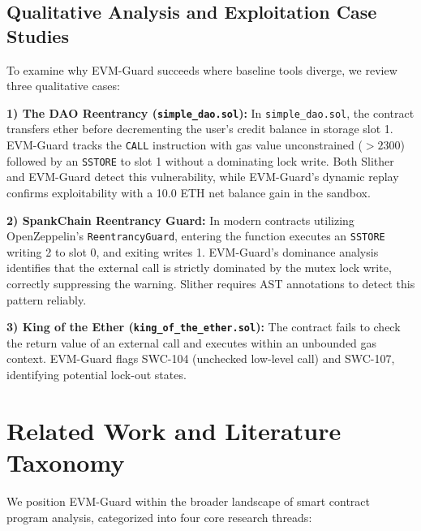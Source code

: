 \documentclass[conference]{IEEEtran}
\begin{document}
\subsection{Qualitative Analysis and Exploitation Case Studies}
To examine why EVM-Guard succeeds where baseline tools diverge, we review three qualitative cases:

\smallskip
\noindent\textbf{1) The DAO Reentrancy (\texttt{simple\_dao.sol}):} In \texttt{simple\_dao.sol}, the contract transfers ether before decrementing the user's credit balance in storage slot 1. EVM-Guard tracks the \texttt{CALL} instruction with gas value unconstrained ($> 2300$) followed by an \texttt{SSTORE} to slot 1 without a dominating lock write. Both Slither and EVM-Guard detect this vulnerability, while EVM-Guard's dynamic replay confirms exploitability with a 10.0 ETH net balance gain in the sandbox.

\smallskip
\noindent\textbf{2) SpankChain Reentrancy Guard:} In modern contracts utilizing OpenZeppelin's \texttt{ReentrancyGuard}, entering the function executes an \texttt{SSTORE} writing 2 to slot 0, and exiting writes 1. EVM-Guard's dominance analysis identifies that the external call is strictly dominated by the mutex lock write, correctly suppressing the warning. Slither requires AST annotations to detect this pattern reliably.

\smallskip
\noindent\textbf{3) King of the Ether (\texttt{king\_of\_the\_ether.sol}):} The contract fails to check the return value of an external call and executes within an unbounded gas context. EVM-Guard flags SWC-104 (unchecked low-level call) and SWC-107, identifying potential lock-out states.

\section{Related Work and Literature Taxonomy}\label{sec:related_work}

We position EVM-Guard within the broader landscape of smart contract program analysis, categorized into four core research threads:
\end{document}
